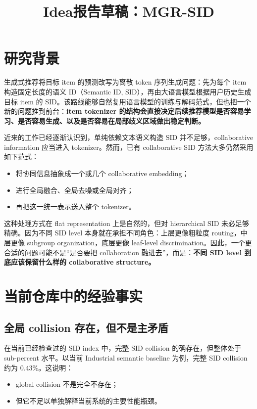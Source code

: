 \documentclass[11pt]{article}
\title{Idea报告草稿：MGR-SID}
\author{}
\date{}
\makeatletter
\renewcommand{\maketitle}{%
  \begin{center}
    {\LARGE \@title\par}
  \end{center}
  \vspace{-0.6\baselineskip}
}
\makeatother
\begin{document}
\maketitle

\section{研究背景}

生成式推荐将目标 item 的预测改写为离散 token 序列生成问题：先为每个 item 构造固定长度的语义 ID（Semantic ID, SID），再由大语言模型根据用户历史生成目标 item 的 SID。该路线能够自然复用语言模型的训练与解码范式，但也把一个新的问题推到前台：\textbf{item tokenizer 的结构会直接决定后续推荐模型是否容易学习、是否容易生成、以及是否容易在局部歧义区域做出稳定判断。}

近来的工作已经逐渐认识到，单纯依赖文本语义构造 SID 并不足够，collaborative information 应当进入 tokenizer。然而，已有 collaborative SID 方法大多仍然采用如下范式：
\begin{itemize}
  \item 将协同信息抽象成一个或几个 collaborative embedding；
  \item 进行全局融合、全局去噪或全局对齐；
  \item 再把这一统一表示送入整个 tokenizer。
\end{itemize}

这种处理方式在 flat representation 上是自然的，但对 hierarchical SID 未必足够精确。因为不同 SID level 本身就在承担不同角色：上层更像粗粒度 routing，中层更像 subgroup organization，底层更像 leaf-level discrimination。因此，一个更合适的问题可能不是“是否要把 collaboration 融进去”，而是：\textbf{不同 SID level 到底应该保留什么样的 collaborative structure。}

\section{当前仓库中的经验事实}

\subsection{全局 collision 存在，但不是主矛盾}

在当前已经检查过的 SID index 中，完整 SID collision 的确存在，但整体处于 sub-percent 水平。以当前 Industrial semantic baseline 为例，完整 SID collision 约为 $0.43\%$。这说明：
\begin{itemize}
  \item global collision 不是完全不存在；
  \item 但它不足以单独解释当前系统的主要性能瓶颈。
\end{itemize}
\end{document}
